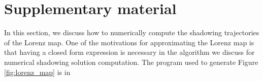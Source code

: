\section{Supplementary material}
In this section, we discuss how to numerically compute the shadowing trajectories of the Lorenz map. One of the motivations for approximating the Lorenz map is that having a closed form expression is necessary in the algorithm we discuss for numerical shadowing solution computation. The program used to generate Figure 
\ref{fig:lorenz_map} is in 